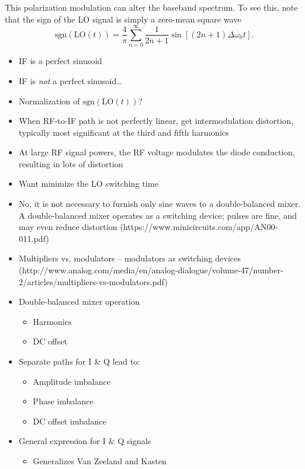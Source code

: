 This polarization modulation can alter the baseband spectrum.
To see this, note that the sign of the LO signal
is simply a zero-mean square wave
\graffito{\textcolor{red}{ref??}}
\begin{equation}
  \text{sgn}\left( \text{LO}(t) \right)
  =
  \frac{4}{\pi}
  \sum_{n = 0}^{\infty}
  \frac{1}{2n + 1} \sin[(2n + 1) \Delta\omega_0 t].
\end{equation}
\begin{itemize}
  \item IF is a perfect sinusoid
  \item IF is \emph{not} a perfect sinusoid\ldots
  \item Normalization of $\text{sgn}(\text{LO}(t))$?
\end{itemize}


\begin{itemize}
  \item When RF-to-IF path is not perfectly linear,
    get intermodulation distortion, typically most significant
    at the third and fifth harmonics
  \item At large RF signal powers, the RF voltage modulates
    the diode conduction, resulting in lots of distortion
  \item Want minimize the LO switching time
  \item No, it is not necessary to furnish only sine waves
    to a double-balanced mixer.
    A double-balanced mixer operates as a switching device;
    pulses are fine, and may even reduce distortion
    (https://www.minicircuits.com/app/AN00-011.pdf)
  \item Multipliers vs. modulators -- modulators as switching devices
    (http://www.analog.com/media/en/analog-dialogue/volume-47/number-2/articles/multipliers-vs-modulators.pdf)
\end{itemize}




\begin{itemize}
  \item Double-balanced mixer operation
    \begin{itemize}
      \item Harmonics
      \item DC offset
    \end{itemize}
  \item Separate paths for I \& Q lead to:
    \begin{itemize}
      \item Amplitude imbalance
      \item Phase imbalance
      \item DC offset imbalance
    \end{itemize}
  \item General expression for I \& Q signals
    \begin{itemize}
      \item Generalizes Van Zeeland and Kasten
    \end{itemize}
\end{itemize}


